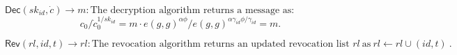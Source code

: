 \documentclass[runningheads]{llncs}
\begin{document}
$\mathsf{Dec}(sk_{id},\dot{c})\to m:\text{The decryption algorithm returns a message as:}$
\begin{equation*} c_{0}/\dot {c}_{0}^{1/sk_{id}}=m\cdot e(g,g)^{\alpha \phi }/ e(g,g)^{\alpha \gamma _{id}\phi /\gamma _{id}}=m.\end{equation*}

$\mathsf{Rev}(rl,id,t)\to rl:\text{The revocation algorithm returns an updated revocation list }rl\mathrm{~as~}rl\leftarrow rl\cup(id,t)\mathrm{~.}$
\end{document}
